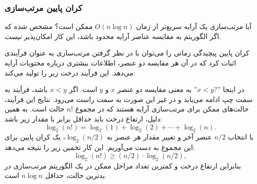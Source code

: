 \subsubsection{کران پایین مرتب‌سازی}

آیا مرتب‌سازی یک آرایه سریع‌تر از زمان $O(n \log n)$ ممکن است؟
مشخص شده که اگر الگوریتم به مقایسه عناصر آرایه محدود باشد، این کار امکان‌پذیر \emph{نیست}.

کران پایین پیچیدگی زمانی را می‌توان با در نظر گرفتن مرتب‌سازی به عنوان فرآیندی اثبات کرد که در آن هر مقایسه دو عنصر، اطلاعات بیشتری درباره محتویات آرایه می‌دهد.
این فرآیند درخت زیر را تولید می‌کند:

\begin{center}
\end{center}

در اینجا ''$x<y?$'' به معنی مقایسه دو عنصر $x$ و $y$ است.
اگر $x<y$ باشد، فرآیند به سمت چپ ادامه می‌یابد
و در غیر این صورت به سمت راست می‌رود.
نتایج این فرآیند، حالت‌های ممکن برای مرتب‌سازی آرایه هستند
که در مجموع $n!$ حالت است.
به همین دلیل، ارتفاع درخت باید حداقل برابر با مقدار زیر باشد:
\[ \log_2(n!) = \log_2(1)+\log_2(2)+\cdots+\log_2(n).\]
با انتخاب $n/2$ عنصر آخر و تغییر مقدار هر عنصر به $\log_2(n/2)$،
یک کران پایین برای این مجموع به دست می‌آوریم.
این کار تخمین زیر را نتیجه می‌دهد:
\[ \log_2(n!) \ge (n/2) \cdot \log_2(n/2),\]
بنابراین ارتفاع درخت و کمترین تعداد مراحل ممکن در یک الگوریتم مرتب‌سازی
در بدترین حالت، حداقل $n \log n$ است.

